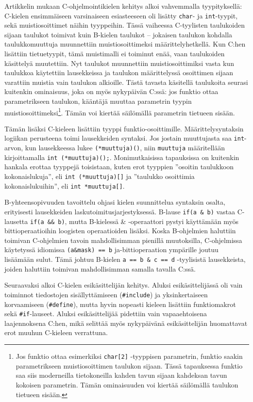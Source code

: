 Artikkelin mukaan C-ohjelmointikielen kehitys alkoi vahvemmalla tyypityksellä:
C-kielen ensimmäiseen varsinaiseen esiasteeseen oli lisätty \texttt{char}- ja
\texttt{int}-tyypit, sekä muistiosoittimet näihin tyyppeihin. Tässä vaiheessa
C-tyylisten taulukoiden sijaan taulukot toimivat kuin B-kielen taulukot --
jokaisen taulukon kohdalla taulukkomuuttuja muunnettiin muistiosoittimeksi
määrittelyhetkellä. Kun C:hen lisättiin tietuetyypit, tämä muistimalli ei
toiminut enää, vaan taulukoiden käsittelyä muutettiin. Nyt taulukot muunnettiin
muistiosoittimiksi vasta kun taulukkoa käytettiin lausekkeissa ja taulukon
määrittelyssä osoittimen sijaan varattiin muistia vain taulukon alkioille.
Tästä tavasta käsitellä taulukoita seurasi kuitenkin ominaisuus, joka on myös
nykypäivän C:ssä: jos funktio ottaa parametrikseen taulukon, kääntäjä muuttaa
parametrin tyypin muistiosoittimeksi\footnote{Jos funktio ottaa esimerkiksi
\texttt{char[2]} -tyyppisen parametrin, funktio saakin parametrikseen
muistiosoittimen taulukon sijaan. Tässä tapauksessa funktio saa siis
moderneilla tietokoneilla kahden tavun sijaan kahdeksan tavun kokoisen
parametrin. Tämän ominaisuuden voi kiertää säilömällä taulukon tietueen
sisään.}. Tämän voi kiertää säilömällä parametrin tietueen sisään.

Tämän lisäksi C-kieleen lisättiin tyyppi funktio-osoittimille.
Määrittelysyntaksin logiikan perusteena toimi lausekkeiden syntaksi. Jos
jostain muuttujasta saa \texttt{int}-arvon, kun lausekkeessa lukee
\texttt{(*muuttuja)()}, niin \texttt{muuttuja} määritellään kirjoittamalla
\texttt{int~(*muuttuja)();}. Monimutkaisissa tapauksissa on kuitenkin hankala
erottaa tyyppejä toisistaan, kuten erot tyyppien ''osoitin taulukkoon
kokonaislukuja'', eli \texttt{int~(*muuttuja)[]} ja ''taulukko osoittimia
kokonaislukuihin'', eli \texttt{int~*muuttuja[]}.

B-yhteensopivuuden tavoittelu ohjasi kielen suunnittelua syntaksin osalta,
erityisesti lausekkeiden laskutoimitusjarjestyksessä. B-lause
\texttt{if(a~\&~b)} vastaa C-lausetta \texttt{if(a~\&\&~b)}, mutta B-kielessä
\& -operaattori pystyi käyttämään myös bittioperaatioihin loogisten
operaatioiden lisäksi. Koska B-ohjelmien haluttiin toimivan C-ohjelmien tavoin
mahdollisimman pienillä muutoksilla, C-ohjelmissa käytetyssä idiomissa
\texttt{(a\&mask)~==~b} ja-bittioperaation ympärille joutuu lisäämään sulut.
Tämä johtuu B-kielen \texttt{a == b \& c == d} -tyylisistä lausekkeista, joiden
haluttiin toimivan mahdollisimman samalla tavalla C:ssä.

Seuraavaksi alkoi C-kielen esikäsittelijän kehitys. Aluksi esikäsittelijässä
oli vain toiminnot tiedostojen sisällyttämiseen (\texttt{\#include}) ja
yksinkertaiseen korvaamiseen (\texttt{\#define}), mutta hyvin nopeasti
kieleen lisättiin funktiomakrot sekä \texttt{\#if}-lauseet. Aluksi
esikäsittelijää pidettiin vain vapaaehtoisena laajennoksena C:hen, mikä
selittää myös nykypäivänä esikäsittelijän huomattavat erot muuhun C-kieleen
verrattuna.

